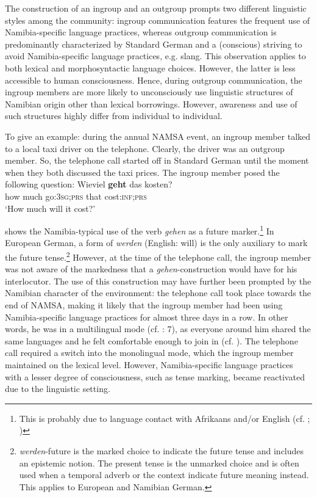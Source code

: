 \documentclass[output=paper]{langsci/langscibook}
\begin{document}
The construction of an ingroup and an outgroup prompts two different linguistic styles among the community: ingroup communication features the frequent use of Namibia-specific language practices, whereas outgroup communication is predominantly characterized by Standard German and a (conscious) striving to avoid Namibia-specific language practices, e.g. slang. This observation applies to both lexical and morphosyntactic language choices. However, the latter is less accessible to human consciousness. Hence, during outgroup communication, the ingroup members are more likely to unconsciously use linguistic structures of Namibian origin other than lexical borrowings. However, awareness and use of such structures highly differ from individual to individual. 

To give an example: during the annual NAMSA event, an ingroup member talked to a local taxi driver on the telephone. Clearly, the driver was an outgroup member. So, the telephone call started off in Standard German until the moment when they both discussed the taxi prices. The ingroup member posed the following question:
\ea
\label{ex:radke:3}
 	\gll Wieviel \textbf{geht} das kosten? \\
		{how much}  go:\textsc{3sg;prs}   that  cost\textsc{:inf;prs}\\
     \glt `How much will it cost?'\\
 \z
 
 shows the Namibia-typical use of the verb \textit{gehen} as a future marker.\footnote{This is probably due to language contact with Afrikaans and/or English (cf. \citealt[33]{shah_german_2007}; \citealt[234--235]{radke_hat_2019b})} In European German, a form of \textit{werden} (English: will) is the only auxiliary to mark the future tense.\footnote{\textit{werden}-future is the marked choice to indicate the future tense and includes an epistemic notion. The present tense is the unmarked choice and is often used when a temporal adverb or the context indicate future meaning instead. This applies to European and Namibian German.}  However, at the time of the telephone call, the ingroup member was not aware of the markedness that a \textit{gehen}-construction would have for his interlocutor. The use of this construction may have further been prompted by the Namibian character of the environment: the telephone call took place towards the end of NAMSA, making it likely that the ingroup member had been using Namibia-specific language practices for almost three days in a row. In other words, he was in a multilingual mode (cf. \citealt{hoder_mehrsprachige_2018}: 7), as everyone around him shared the same languages and he felt comfortable enough to join in (cf. \citealt[2]{grosjean_bilingual_2012}). The telephone call required a switch into the monolingual mode, which the ingroup member maintained on the lexical level. However, Namibia-specific language practices with a lesser degree of consciousness, such as tense marking, became reactivated due to the linguistic setting.
  
\end{document}
